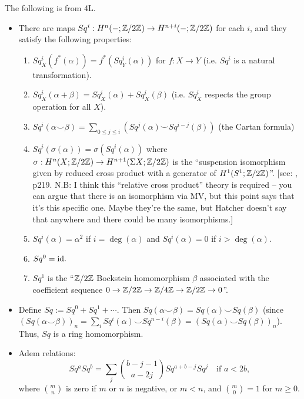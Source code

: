 \documentclass{MetricNotes2023}
\def\inte{\ensuremath\mathbb{Z}}
\def\id{\ensuremath\text{id}}
\begin{document}
The following is from \autocite{hatcher} 4L.

\begin{itemize}
\item There are maps \(Sq^i : H^n(-; \inte/2\inte)\to H^{n+i}(- ; \inte/2\inte)\) for each \(i\), and they satisfy the following properties: \begin{enumerate}
\item \(Sq^i_X(f^*(\alpha))=f^*(Sq^i_Y(\alpha))\) for \(f : X \to Y\) (i.e. \(Sq^i\) is a natural transformation).
\item \(Sq^i_X(\alpha + \beta)=Sq^i_X(\alpha)+Sq^i_X(\beta)\) (i.e. \(Sq_X^i\) respects the group operation for all \(X\)).
\item \(Sq^i(\alpha \smile \beta)=\sum\limits_{0\leq j \leq i} (Sq^j(\alpha)\smile Sq^{i-j}(\beta))\) (the Cartan formula)
\item \(Sq^i(\sigma(\alpha))=\sigma(Sq^i(\alpha))\) where \(\sigma : H^n(X; \inte/2\inte)\to H^{n+1}(\Sigma X; \inte/2\inte)\) is the ``suspension isomorphism given by reduced cross product with a generator of \(H^1(S^1; \inte/2\inte)\)''. [see: \autocite{hatcher}, p219. N.B: I think this ``relative cross product'' theory is required -- you can argue that there is an isomorphism via MV, but this point says that it's this specific one. Maybe they're the same, but Hatcher doesn't say that anywhere and there could be many isomorphisms.]
\item \(Sq^i(\alpha)=\alpha^2\) if \(i=\deg(\alpha)\) and \(Sq^i(\alpha)=0\) if \(i> \deg(\alpha)\). %
\item \(Sq^0=\id.\)
\item \(Sq^1\) is the ``\(\inte/2\inte\) Bockstein homomorphism \(\beta\) associated with the coefficient sequence \(0 \to \inte/2\inte \to \inte/4\inte \to \inte/2\inte \to 0\)''. 
\end{enumerate}
\item Define \(Sq:=Sq^0+Sq^1+\cdots\). Then \(Sq(\alpha\smile \beta)=Sq(\alpha)\smile Sq(\beta)\) (since \((Sq(\alpha\smile \beta))_n=\sum_iSq^i(\alpha)\smile Sq^{n-i}(\beta)=(Sq(\alpha)\smile Sq(\beta))_n\)). Thus, \(Sq\) is a ring homomorphism. 
\item Adem relations:
\[Sq^aSq^b=\sum_j {b-j-1\choose a-2j}Sq^{a+b-j}Sq^j \quad \text{if } a<2b,\]
where \({m \choose n}\) is zero if \(m\) or \(n\) is negative, or \(m<n\), and \({m \choose 0}=1\) for \(m \geq 0\).
\end{itemize}
\end{document}
